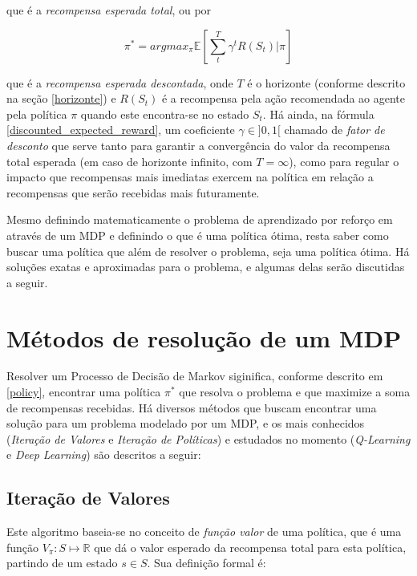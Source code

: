 \documentclass[cic,tc]{iiufrgs}
\begin{document}
 que é a \textit{recompensa esperada total}, ou por

\begin{equation} \label{discounted_expected_reward}
  \pi^* = argmax_\pi\mathbb{E}[\sum_t^T\gamma^tR(S_t) | \pi]
\end{equation}

que é a \textit{recompensa esperada descontada}, onde $T$ é o horizonte
(conforme descrito na seção \ref{horizonte}) e $R(S_t)$ é a recompensa pela ação
recomendada ao agente pela política $\pi$ quando este encontra-se no estado
$S_t$. Há ainda, na fórmula \ref{discounted_expected_reward}, um coeficiente
$\gamma \in ]0,1[$ chamado de \textit{fator de desconto} que serve tanto para
garantir a convergência do valor da recompensa total esperada (em caso de horizonte
infinito, com $T = \infty$), como para regular o impacto que recompensas mais
imediatas exercem na política em relação a recompensas que serão recebidas mais
futuramente.


Mesmo definindo matematicamente o problema de aprendizado por reforço em
através de um MDP e definindo o que é uma política ótima, resta saber como
buscar uma política que além de resolver o problema, seja uma política ótima.
Há soluções exatas e aproximadas para o problema, e algumas delas serão
discutidas a seguir.

\section{Métodos de resolução de um MDP}
Resolver um Processo de Decisão de Markov siginifica, conforme descrito em
\ref{policy}, encontrar uma política $\pi^*$ que resolva o problema e que
maximize a soma de recompensas recebidas. Há diversos métodos que buscam
encontrar uma solução para um problema modelado por um MDP, e os mais
conhecidos (\textit{Iteração de Valores} e \textit{Iteração de
Políticas}) e estudados no momento (\textit{Q-Learning} e \textit{Deep
Learning}) são descritos a seguir:

\subsection{Iteração de Valores}


Este algoritmo baseia-se no conceito de \textit{função valor} de uma política,
que é uma função $V_\pi: S \mapsto \mathbb{R}$ que dá o valor
esperado da recompensa total para esta política, partindo de um estado $s \in S$.
Sua definição formal é:
\end{document}
